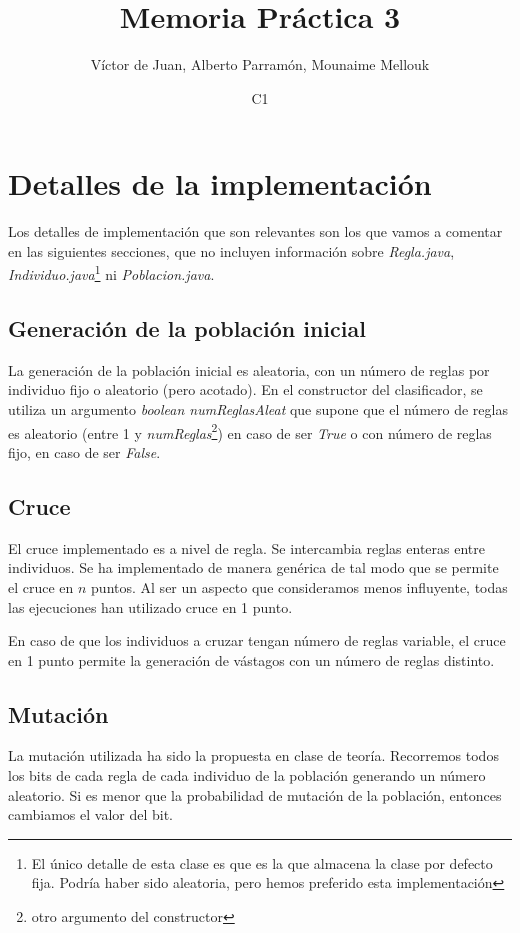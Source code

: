 \documentclass[nochap]{apuntes}
\title{Memoria Práctica 3}
\author{Víctor de Juan, Alberto Parramón, Mounaime Mellouk}
\date{C1}
\begin{document}
\pagestyle{plain}
\maketitle

\tableofcontents
\newpage

\chapter{Detalles de la implementación}
Los detalles de implementación que son relevantes son los que vamos a comentar en las siguientes secciones, que no incluyen información sobre \textit{Regla.java}, \textit{Individuo.java}\footnote{El único detalle de esta clase es que es la que almacena la clase por defecto fija. Podría haber sido aleatoria, pero hemos preferido esta implementación} ni \textit{Poblacion.java}. 

\section{Generación de la población inicial}

La generación de la población inicial es aleatoria, con un número de reglas por individuo fijo o aleatorio (pero acotado). En el constructor del clasificador, se utiliza un argumento \textit{boolean numReglasAleat} que supone que el número de reglas es aleatorio (entre 1 y \textit{numReglas}\footnote{otro argumento del constructor}) en caso de ser \textit{True} o con número de reglas fijo, en caso de ser \textit{False}.


\section{Cruce}
El cruce implementado es a nivel de regla. Se intercambia reglas enteras entre individuos. Se ha implementado de manera genérica de tal modo que se permite el cruce en $n$ puntos. Al ser un aspecto que consideramos menos influyente, todas las ejecuciones han utilizado cruce en 1 punto.

En caso de que los individuos a cruzar tengan número de reglas variable, el cruce en 1 punto permite la generación de vástagos con un número de reglas distinto.

\section{Mutación}
La mutación utilizada ha sido la propuesta en clase de teoría. Recorremos todos los bits de cada regla de cada individuo de la población generando un número aleatorio. Si es menor que la probabilidad de mutación de la población, entonces cambiamos el valor del bit.
\end{document}
